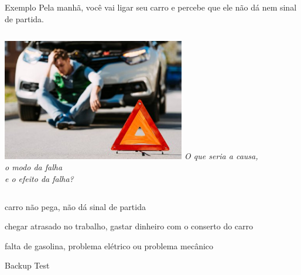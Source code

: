 \documentclass[aspectratio=169]{beamer}
\begin{document}
\begin{frame}[c]{Exemplo}
    Pela manhã, você vai ligar seu carro e percebe que ele não dá nem sinal de partida.
    \vspace{.5cm}
    \begin{columns}[c]
            \includegraphics[width=0.6\textwidth, trim={0 0 0 0},clip]{carro-quebrado}
            \centering
            \emph{O que seria a causa,\\o modo da falha \\e o efeito da falha?}
    \end{columns}
    \vspace{.5cm}
    \begin{description}[rightmargin=1em,style=nextline]
        \item[MODO] carro não pega, não dá sinal de partida
        \item[EFEITO] chegar atrasado no trabalho, gastar dinheiro com o conserto do carro 
        \item[CAUSA] falta de gasolina, problema elétrico ou problema mecânico
    \end{description}
\end{frame}
\backupbegin
\begin{frame}[t]{Backup}
Test
\end{frame}
%
\backupend
\begin{frame}[t,plain]
\end{frame}
\end{document}
